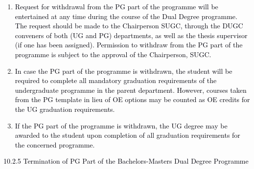 \documentclass[12pt]{article}
\begin{document}
\vspace{\baselineskip}
\begin{enumerate}
	\item {\fontsize{9pt}{10.8pt}\selectfont \textcolor[HTML]{00000A}{Request for withdrawal from the PG part of the programme will be entertained at any time during the course of the Dual Degree programme. The request should be made to the Chairperson SUGC, through the DUGC conveners of both (UG and PG) departments, as well as the thesis supervisor (if one has been assigned). Permission to withdraw from the PG part of the programme is subject to the approval of the Chairperson, SUGC.}\par}\par


\vspace{\baselineskip}
	\item {\fontsize{10pt}{12.0pt}\selectfont \textcolor[HTML]{00000A}{In case the PG part of the programme is withdrawn, the student will be required to complete all mandatory graduation requirements of the undergraduate programme in the parent department. However, courses taken from the PG template in lieu of OE options may be counted as OE credits for the UG graduation requirements.}\par}\par


\vspace{\baselineskip}
	\item {\fontsize{10pt}{12.0pt}\selectfont \textcolor[HTML]{00000A}{If the PG part of the programme is withdrawn, the UG degree may be awarded to the student upon completion of all graduation requirements for the concerned programme.}\par}
\end{enumerate}\par


\vspace{\baselineskip}
{\fontsize{10pt}{12.0pt}\selectfont \textcolor[HTML]{00000A}{10.2.5 Termination of PG Part of the Bachelors-Masters Dual Degree Programme}\par}\par
\end{document}
